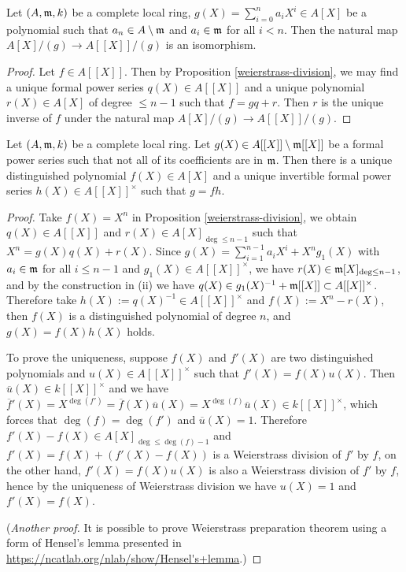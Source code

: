 \begin{cor}
\label{isom-given-by-weierstrass-division}
\leanok
Let $(A,{\mathfrak{m}},k)$ be a complete local ring,
$g(X)=\sum_{i=0}^n a_iX^i\in A[X]$ be a polynomial
such that $a_n\in A\setminus{\mathfrak{m}}$ and $a_i\in{\mathfrak{m}}$ for all $i<n$.
Then the natural map $A[X]/(g)\to A[[X]]/(g)$
is an isomorphism.
\end{cor}

\begin{proof}
\leanok
Let $f\in A[[X]]$.
Then by Proposition \ref{weierstrass-division},
we may find a unique formal power series
$q(X)\in A[[X]]$ and a unique polynomial $r(X)\in A[X]$ of degree $\leq n-1$
such that $f=gq+r$.
Then $r$ is the unique inverse of $f$ under the natural map $A[X]/(g)\to A[[X]]/(g)$.
\end{proof}

\begin{prop}
\label{weierstrass-preparation}
\leanok
Let $(A,{\mathfrak{m}},k)$ be a complete local ring.
Let $g(X)\in A[[X]]\setminus{\mathfrak{m}}[[X]]$ be a formal power series
such that not all of its coefficients are in ${\mathfrak{m}}$.
Then there is a unique distinguished polynomial $f(X)\in A[X]$
and a unique invertible formal power series $h(X)\in A[[X]]^\times$ such that $g=fh$.
\end{prop}

\begin{proof}
\leanok
Take $f(X)=X^n$ in Proposition \ref{weierstrass-division}, we obtain $q(X)\in A[[X]]$
and $r(X)\in A[X]_{\deg\leq n-1}$ such that $X^n=g(X)q(X)+r(X)$.
Since $g(X)=\sum_{i=1}^{n-1}a_iX^i+X^ng_1(X)$
with $a_i\in{\mathfrak{m}}$ for all $i\leq n-1$ and $g_1(X)\in A[[X]]^\times$,
we have $r(X)\in{\mathfrak{m}}[X]_{\deg\leq n-1}$, and by the construction in (ii)
we have $q(X)\in g_1(X)^{-1}+{\mathfrak{m}}[[X]]\subset A[[X]]^\times$.
Therefore take $h(X):=q(X)^{-1}\in A[[X]]^\times$
and $f(X):=X^n-r(X)$, then $f(X)$ is a distinguished polynomial of degree $n$,
and $g(X)=f(X)h(X)$ holds.

To prove the uniqueness, suppose $f(X)$ and $f'(X)$ are two distinguished polynomials
and $u(X)\in A[[X]]^\times$ such that $f'(X)=f(X)u(X)$.
Then $\overline u(X)\in k[[X]]^\times$ and we have
$\overline f{}'(X)=X^{\deg(f')}=\overline f(X)\overline u(X)
=X^{\deg(f)}\overline u(X)\in k[[X]]^\times$,
which forces that $\deg(f)=\deg(f')$ and $\overline u(X)=1$.
Therefore $f'(X)-f(X)\in A[X]_{\deg\leq\deg(f)-1}$
and $f'(X)=f(X)+(f'(X)-f(X))$ is a Weierstrass division of $f'$ by $f$,
on the other hand, $f'(X)=f(X)u(X)$ is also a Weierstrass division of $f'$ by $f$,
hence by the uniqueness of Weierstrass division
we have $u(X)=1$ and $f'(X)=f(X)$.

(\emph{Another proof.}
It is possible to prove Weierstrass preparation theorem using a form
of Hensel's lemma presented in \url{https://ncatlab.org/nlab/show/Hensel's+lemma}.)
\end{proof}

